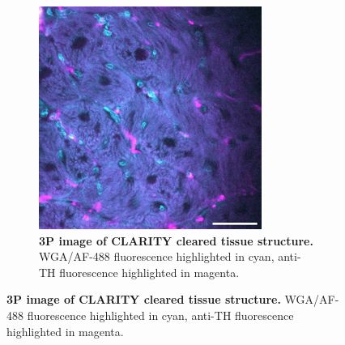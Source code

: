 \begin{figure}[H]
\begin{subfigure}[t]{0.475\textwidth}
\includegraphics[width=1\linewidth]{Images/CLARITY_3P.png}
\caption{\textbf{3P image of CLARITY cleared tissue structure.} WGA/AF-488 fluorescence highlighted in cyan, anti-TH fluorescence highlighted in magenta.}
\label{fig:enter-label}
\end{subfigure}
\medskip


\end{figure}
